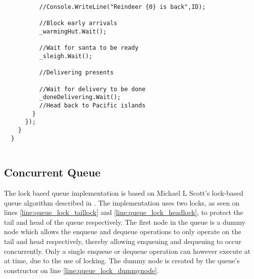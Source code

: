 \begin{lstlisting}
          //Console.WriteLine("Reindeer {0} is back",ID);

          //Block early arrivals
          _warmingHut.Wait();

          //Wait for santa to be ready
          _sleigh.Wait();

          //Delivering presents

          //Wait for delivery to be done
          _doneDelivering.Wait();
          //Head back to Pacific islands
        }
      });
    }
  }
  
\end{lstlisting}

\subsection{Concurrent Queue}
The lock based queue implementation is based on Michael L Scott's lock-based queue algorithm described in \cite{michael1996simple}. The implementation uses two locks, as seen on lines \ref{line:queue_lock_taillock} and \ref{line:queue_lock_headlock}, to protect the tail and head of the queue respectively. The first node in the queue is a dummy node which allows the enqueue and dequeue operations to only operate on the tail and head respectively, thereby allowing enqueuing and dequeuing to occur concurrently. Only a single enqueue or dequeue operation can however execute at at time, due to the use of locking. The dummy node is created by the queue's constructor on line \ref{line:queue_lock_dummynode}.

